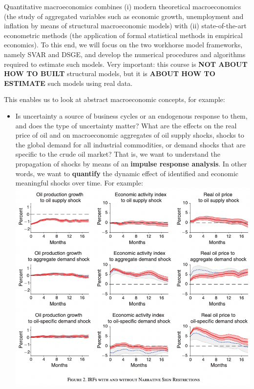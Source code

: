 Quantitative macroeconomics combines (i) modern theoretical macroeconomics
  (the study of aggregated variables such as economic growth, unemployment and inflation
  by means of structural macroeconomic models)
  with (ii) state-of-the-art econometric methods (the application of formal statistical methods in empirical economics).
To this end, we will focus on the two workhorse model frameworks, namely SVAR and DSGE,
  and develop the numerical procedures and algorithms required to estimate such models.
Very important: this course is \textbf{NOT ABOUT HOW TO BUILT} structural models,
  but it is \textbf{ABOUT HOW TO ESTIMATE} such models using real data.

This enables us to look at abstract macroeconomic concepts, for example:
\begin{itemize}
  \item Is uncertainty a source of business cycles or an endogenous response to them, and does the type of uncertainty matter?
  What are the effects on the real price of oil and on macroeconomic aggregates of
    oil supply shocks, shocks to the global demand for all industrial commodities,
    or demand shocks that are specific to the crude oil market?
  That is, we want to understand the propagation of shocks by means of an \textbf{impulse response analysis}.
  In other words, we want to \textbf{quantify} the dynamic effect of identified and economic meaningful shocks over time.
  For example:\\\includegraphics*[width=\textwidth]{plots/NarrativeSignRestrictionsIRFs.png}

\end{itemize}
